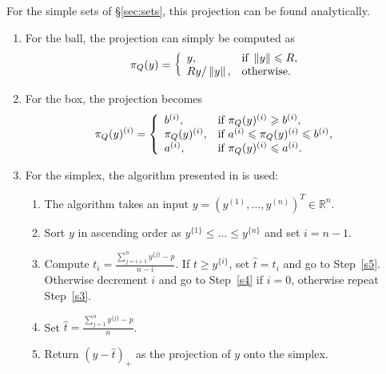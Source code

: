 \documentclass[final]{aomart}
\newtheorem[{}\it]{thm}{Theorem}[section]
\theoremstyle{definition}
\newtheorem*[{}\it]{notation}{Notation}
\numberwithin{equation}{section}
\newcommand{\secref}[1]{\S\ref{#1}}
\newcommand{\enVert}[1]{\left\lVert#1\right\rVert}
\let\norm=\enVert
\newcommand{\proj}{\pi_Q(y)}
\begin{document}
For the simple sets of \secref{sec:sets}, this projection can be found analytically.
\begin{enumerate}
	\item For the ball, the projection can simply be computed as
	\begin{equation}
	\proj = \left\{
	\begin{array}{ll}
	y, & \textnormal{if } \norm{y} \leqslant R,\\
	R y / \norm{y}, & \textnormal{otherwise.}
	\end{array}
	\right.
	\end{equation}
	\item For the box, the projection becomes
	\begin{equation}
	\proj^{(i)} = \left\{
	\begin{array}{ll}
	b^{(i)}, & \textnormal{if } \proj^{(i)} \geqslant b^{(i)},\\
	\proj^{(i)}, & \textnormal{if } a^{(i)} \leqslant \proj^{(i)} \leqslant b^{(i)},\\
	a^{(i)}, & \textnormal{if } \proj^{(i)} \leqslant a^{(i)}.
	\end{array}
	\right.
	\end{equation}
	\item For the simplex, the algorithm presented in \cite{Chen2011} is used:
	\begin{enumerate}
		\item The algorithm takes an input \(y = (y^{(1)}, \dots, y^{(n)})^T \in \mathbb{R}^n\).
		\item Sort \(y\) in ascending order as \(y^{\{1\}} \leqslant \dots \leqslant y^{\{n\}}\) and set \(i = n-1\).
		\item \label{s3} Compute \(t_i = \frac{\sum_{j = i+1}^{n} y^{\{j\}} - p}{n - i}\).
		If \(t \geqslant y^{\{i\}}\), set \(\hat{t} = t_i\) and go to Step~\ref{s5}.
		Otherwise decrement \(i\) and go to Step~\ref{s4} if \(i = 0\), otherwise repeat Step~\ref{s3}.
		\item \label{s4}
		Set \(\hat{t} = \frac{\sum_{j=1}^n y^{\{j\}} - p}{n}\).
		\item \label{s5}
		Return \((y - \hat{t})_+\) as the projection of \(y\) onto the simplex.
	\end{enumerate}
\end{enumerate}
\end{document}
